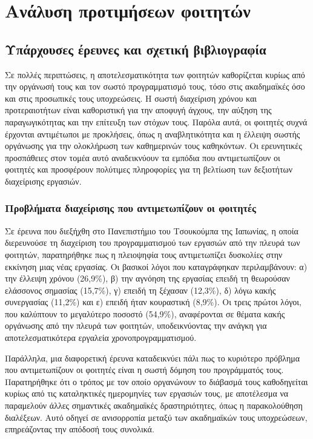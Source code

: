 \chapter{Ανάλυση προτιμήσεων φοιτητών}
    \section{Υπάρχουσες έρευνες και σχετική βιβλιογραφία}
        Σε πολλές περιπτώσεις, η αποτελεσματικότητα των φοιτητών καθορίζεται κυρίως από την οργάνωσή τους και τον σωστό προγραμματισμό τους, τόσο στις ακαδημαϊκές όσο και στις προσωπικές τους υποχρεώσεις. Η σωστή διαχείριση χρόνου και προτεραιοτήτων είναι καθοριστική για την αποφυγή άγχους, την αύξηση της παραγωγικότητας και την επίτευξη των στόχων τους. Παρόλα αυτά, οι φοιτητές συχνά έρχονται αντιμέτωποι με προκλήσεις, όπως η αναβλητικότητα και η έλλειψη σωστής οργάνωσης για την ολοκλήρωση των καθημερινών τους καθηκόντων. Οι ερευνητικές προσπάθειες στον τομέα αυτό αναδεικνύουν τα εμπόδια που αντιμετωπίζουν οι φοιτητές και προσφέρουν πολύτιμες πληροφορίες για τη βελτίωση των δεξιοτήτων διαχείρισης εργασιών.

        \subsection{Προβλήματα διαχείρισης που αντιμετωπίζουν οι φοιτητές} \label{sec:student_problems}
            Σε έρευνα \cite{Fukuzawa2015} που διεξήχθη στο Πανεπιστήμιο του Τσουκούμπα της Ιαπωνίας, η οποία διερευνούσε τη διαχείριση του προγραμματισμού των εργασιών από την πλευρά των φοιτητών, παρατηρήθηκε πως η πλειοψηφία τους αντιμετωπίζει δυσκολίες στην εκκίνηση μιας νέας εργασίας. Οι βασικοί λόγοι που καταγράφηκαν περιλαμβάνουν: α) την έλλειψη χρόνου (26,9\%), β) την αγνόηση της εργασίας επειδή τη θεωρούσαν ελάσσονος σημασίας (15,7\%), γ) επειδή τη ξέχασαν (12,3\%), δ) λόγω κακής συνεργασίας (11,2\%) και ε) επειδή ήταν κουραστική (8,9\%). Οι τρεις πρώτοι λόγοι, που καλύπτουν το μεγαλύτερο ποσοστό (54,9\%), αναφέρονται σε θέματα κακής οργάνωσης από την πλευρά των φοιτητών, υποδεικνύοντας την ανάγκη για αποτελεσματικότερα εργαλεία χρονοπρογραμματισμού.

            Παράλληλα, μια διαφορετική έρευνα \cite{Trujillo2020} καταδεικνύει πάλι πως το κυριότερο πρόβλημα που αντιμετωπίζουν οι φοιτητές είναι η σωστή δόμηση του προγράμματός τους. Παρατηρήθηκε ότι ο τρόπος με τον οποίο οργανώνουν το διάβασμά τους καθοδηγείται κυρίως από τις καταληκτικές ημερομηνίες των εργασιών τους, με αποτέλεσμα να παραμελούν άλλες σημαντικές ακαδημαϊκές δραστηριότητες, όπως η παρακολούθηση διαλέξεων. Αυτό οδηγεί σε ανισορροπία μεταξύ των ακαδημαϊκών τους υποχρεώσεων, επηρεάζοντας την απόδοσή τους συνολικά.

